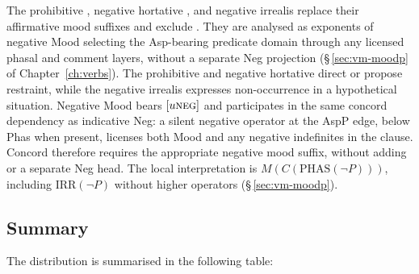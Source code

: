 The prohibitive , negative hortative , and negative irrealis
 replace their affirmative mood suffixes and exclude .
They are analysed as exponents of negative Mood selecting the Asp-bearing
predicate domain through any licensed phasal and comment layers, without a
separate Neg projection (§\,\ref{sec:vm-moodp} of Chapter~\ref{ch:verbs}).
The prohibitive and negative hortative direct or propose restraint, while the
negative irrealis expresses non-occurrence in a hypothetical situation.
Negative Mood bears $[u\textsc{neg}]$ and participates in the same concord dependency as
indicative Neg: a silent negative operator at the AspP edge, below Phas when present, licenses both
Mood and any negative indefinites in the clause. Concord therefore requires
the appropriate negative mood suffix, without adding  or a separate
Neg head. The local interpretation is $M(C(\mathrm{PHAS}(\neg P)))$, including
$\mathrm{IRR}(\neg P)$ without higher operators
(§\,\ref{sec:vm-moodp}).

\subsection{Summary}

The distribution is summarised in the following table:

